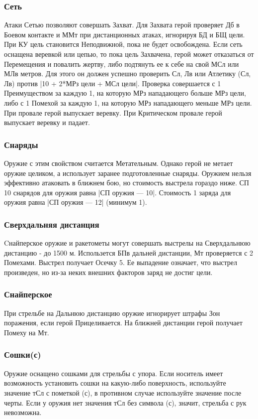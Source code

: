 \subsubsection{Сеть} Атаки Сетью позволяют совершать Захват. Для Захвата герой проверяет Дб в Боевом контакте и ММт при дистанционных атаках, игнорируя БД и БЩ цели. При КУ цель становится Неподвижной, пока не будет освобождена.
\newline Если сеть оснащена веревкой или цепью, то пока цель Захвачена, герой может отказаться от Перемещения и повалить жертву, либо подтянуть ее к себе на свой МСл или МЛв метров.  Для этого он должен успешно проверить Сл, Лв или Атлетику (Сл, Лв) против |10 + 2*МРз цели + МСл цели|. 
\newline Проверка совершается с 1 Преимуществом за каждую 1, на которую МРз нападающего больше МРз цели, либо с 1 Помехой за каждую 1, на которую МРз нападающего меньше МРз цели. При провале герой выпускает веревку. При Критическом провале герой выпускает веревку и падает. 
\subsubsection{Снаряды} Оружие с этим свойством считается Метательным. Однако герой не метает оружие целиком, а использует заранее подготовленные снаряды. Оружием нельзя эффективно атаковать в ближнем бою, но стоимость выстрела гораздо ниже. СП 10 снарядов для оружия равна |СП оружия — 10|. Стоимость 1 заряда для оружия равна |СП оружия — 12| (минимум 1). 
\subsubsection{Сверхдальняя дистанция} Cнайперское оружие и ракетометы могут совершать выстрелы на Сверхдальнюю дистанцию - до 1500 м. Использется БПв дальней дистанции, Мт проверяется с 2 Помехами. Выстрел получает Осечку 5. Ее выпадение означает, что выстрел произведен, но из-за неких внешних факторов заряд не достиг цели.
\subsubsection{Снайперское} При стрельбе на Дальнюю дистанцию оружие игнорирует штрафы Зон поражения, если герой Прицеливается. На ближней дистанции герой получает Помеху на Мт.
\subsubsection{Сошки(с)} Оружие оснащено сошками для стрельбы с упора. Если носитель имеет возможность установить сошки на какую-либо поверхность, используйте значение тСл с пометкой (с), в противном случае используйте значение после черты. Если у оружия нет значения тСл без символа (с), значит, стрельба с рук невозможна.
